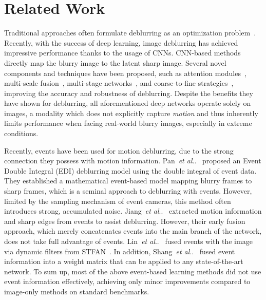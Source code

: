 \documentclass[runningheads]{llncs}
\makeatletter
\DeclareRobustCommand\onedot{\futurelet\@let@token\@onedot}
\def\@onedot{\ifx\@let@token.\else.\null\fi\xspace}
\def\etal{\emph{et al}\onedot}
\newcommand{\PAR}[1]{\noindent{\bf #1}}
\newlength \g
\makeatother
\begin{document}
\section{Related Work}
\label{sec:related_work}





\PAR{Image deblurring.} Traditional approaches often formulate deblurring as an optimization problem~\cite{fergus2006removing,kotera2013blind,krishnan2011blind,levin2009understanding,levin2011efficient,xu2013unnatural}. Recently, with the success of deep learning, 
image deblurring has achieved impressive performance thanks to the usage of CNNs. CNN-based methods directly map the blurry image to the latent sharp image. Several novel components and techniques have been proposed, such as attention modules~\cite{suin2020spatially,tsai2021banet}, multi-scale fusion~\cite{nah2017deep,tao2018scale}, multi-stage networks~\cite{chen2021hinet,zamir2021multi}, and coarse-to-fine strategies~\cite{cho2021rethinking}, improving the accuracy and robustness of deblurring. Despite the benefits they have shown for deblurring, all aforementioned deep networks operate solely on images, a modality which does not explicitly capture \emph{motion} and thus inherently limits performance when facing real-world blurry images, especially in extreme conditions.


\PAR{Event-based deblurring.} Recently, events have been used for motion deblurring, due to the strong connection they possess with motion information. Pan~\etal~\cite{pan2019bringing_high_framerate} proposed an Event Double Integral (EDI) deblurring model using the double integral of event data. They established a mathematical event-based model mapping blurry frames to sharp frames, which is a seminal approach to deblurring with events. However, limited by the sampling mechanism of event cameras, this method often introduces strong, accumulated noise.
Jiang~\etal~\cite{jiang2020learning_event_motion_deblur} extracted motion information and sharp edges from events to assist deblurring. However, their early fusion approach, which merely concatenates events into the main branch of the network, does not take full advantage of events. Lin~\etal~\cite{lin2020learning_event_video_deblur} fused events with the image via dynamic filters from STFAN~\cite{zhou2019spatio}. In addition, Shang~\etal~\cite{shang2021bringing} fused event information into a weight matrix that can be applied to any state-of-the-art network.
To sum up, most of the above event-based learning methods did not use event information effectively, achieving only minor improvements compared to image-only methods on standard benchmarks.
\end{document}
